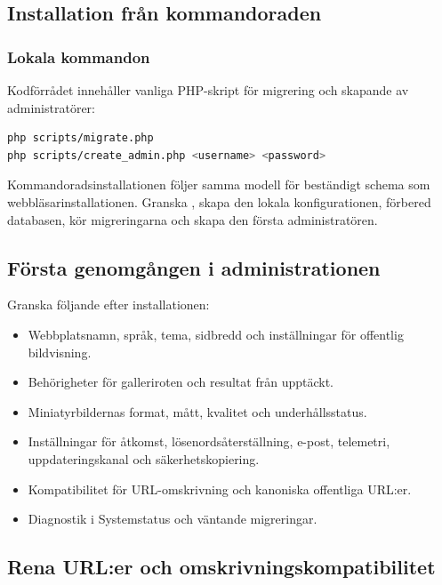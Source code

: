 \documentclass[11pt,a4paper]{article}
\newcommand{\filepath}[1]{\path{#1}}
\begin{document}
\subsection{Installation från kommandoraden}

\subsubsection{Lokala kommandon}

Kodförrådet innehåller vanliga PHP-skript för migrering och skapande av
administratörer:

\begin{lstlisting}[language=bash]
php scripts/migrate.php
php scripts/create_admin.php <username> <password>
\end{lstlisting}

Kommandoradsinstallationen följer samma modell för beständigt schema som
webbläsarinstallationen. Granska \filepath{config.example.php}, skapa den lokala
konfigurationen, förbered databasen, kör migreringarna och skapa den första
administratören.

\subsection{Första genomgången i administrationen}

Granska följande efter installationen:

\begin{itemize}
  \item Webbplatsnamn, språk, tema, sidbredd och inställningar för offentlig
  bildvisning.
  \item Behörigheter för galleriroten och resultat från upptäckt.
  \item Miniatyrbildernas format, mått, kvalitet och underhållsstatus.
  \item Inställningar för åtkomst, lösenordsåterställning, e-post, telemetri,
  uppdateringskanal och säkerhetskopiering.
  \item Kompatibilitet för URL-omskrivning och kanoniska offentliga URL:er.
  \item Diagnostik i Systemstatus och väntande migreringar.
\end{itemize}

\subsection{Rena URL:er och omskrivningskompatibilitet}
\end{document}
